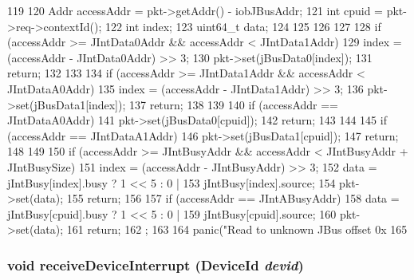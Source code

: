 \begin{DoxyCode}
119 {
120         Addr accessAddr = pkt->getAddr() - iobJBusAddr;
121         int cpuid = pkt->req->contextId();
122         int index;
123         uint64_t data;
124 
125 
126 
127 
128         if (accessAddr >= JIntData0Addr && accessAddr < JIntData1Addr) {
129             index = (accessAddr - JIntData0Addr) >> 3;
130             pkt->set(jBusData0[index]);
131             return;
132         }
133 
134         if (accessAddr >= JIntData1Addr && accessAddr < JIntDataA0Addr) {
135             index = (accessAddr - JIntData1Addr) >> 3;
136             pkt->set(jBusData1[index]);
137             return;
138         }
139 
140         if (accessAddr == JIntDataA0Addr) {
141             pkt->set(jBusData0[cpuid]);
142             return;
143         }
144 
145         if (accessAddr == JIntDataA1Addr) {
146             pkt->set(jBusData1[cpuid]);
147             return;
148         }
149 
150         if (accessAddr >= JIntBusyAddr && accessAddr < JIntBusyAddr + 
      JIntBusySize) {
151             index = (accessAddr - JIntBusyAddr) >> 3;
152             data = jIntBusy[index].busy ? 1 << 5 : 0 |
153                    jIntBusy[index].source;
154             pkt->set(data);
155             return;
156         }
157         if (accessAddr == JIntABusyAddr) {
158             data = jIntBusy[cpuid].busy ? 1 << 5 : 0 |
159                    jIntBusy[cpuid].source;
160             pkt->set(data);
161             return;
162         };
163 
164         panic("Read to unknown JBus offset 0x%
165 }
\end{DoxyCode}
\hypertarget{classIob_a2f2af5343177e6cd711a25e3d34bbc85}{
\subsubsection[{receiveDeviceInterrupt}]{\setlength{\rightskip}{0pt plus 5cm}void receiveDeviceInterrupt ({\bf DeviceId} {\em devid})}}
\label{classIob_a2f2af5343177e6cd711a25e3d34bbc85}



